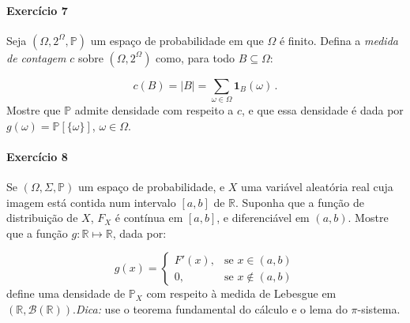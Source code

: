 \documentclass[10pt,a4paper]{article}
\begin{document}
\paragraph{Exercício 7} Seja $(\Omega, 2^\Omega,\mathbb{P})$ um espaço de probabilidade em que $\Omega$ é finito. Defina a \emph{medida de contagem} $c$ sobre  $(\Omega, 2^\Omega)$ como, para todo $B\subseteq \Omega$:

$$c(B) = |B| = \sum_{\omega \in \Omega} \mathbf{1}_B(\omega)\, .$$
Mostre que $\mathbb{P}$ admite densidade com respeito a $c$, e que essa densidade é dada por $g(\omega) = \mathbb{P}[\{\omega\}]$, $\omega \in \Omega$.
\paragraph{Exercício 8} Se $(\Omega, \Sigma,\mathbb{P})$  um espaço de probabilidade, e $X$ uma variável aleatória real cuja imagem está contida num intervalo $[a,b]$ de $\mathbb{R}$. Suponha que a função de distribuição de $X$, $F_X$ é contínua em $[a,b]$, e diferenciável em $(a,b)$. Mostre que a função $g:\mathbb{R}\mapsto \mathbb{R}$, dada por:

$$g(x) = \begin{cases}
	F'(x),&\text{se } x \in (a,b) \\
	0, & \text{se } x \notin (a,b)
\end{cases}$$
define uma densidade de $\mathbb{P}_X$ com respeito à medida de Lebesgue em $(\mathbb{R},\mathcal{B}(\mathbb{R}))$.\textit{Dica:} use o teorema fundamental do cálculo e o lema do $\pi$-sistema.
\end{document}
